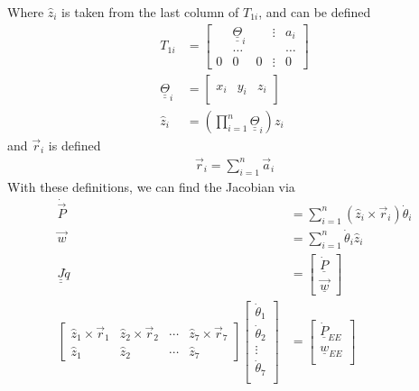 \documentclass{article}
\def\du#1{\underline{\underline{#1}}}
\begin{document}
Where $\hat{z}_i$ is taken from the last column of $T_{1i}$, and can be defined
\begin{align*}
T_{1i} &=
\left[\begin{matrix}
  & \du{\Theta}_i &   & \vdots & a_i \\
  & \hdots   &   &        & \hdots \\
0 &        0 & 0 & \vdots & 0
\end{matrix}\right] \\
\du{\Theta}_i &=
\left[\begin{matrix}
& & \\
x_i & y_i & z_i \\
& &
\end{matrix}\right] \\
\hat{z}_i &= \left( \prod_{i=1}^n \du{\Theta}_i \right) z_i
\end{align*}
and $\vec{r}_i$ is defined
\begin{align*}
\vec{r}_i = \sum_{i=1}^n \vec{a}_i
\end{align*}
With these definitions, we can find the Jacobian via
\begin{align*}
\dot{\vec{P}} &= \sum_{i=1}^{n} \left( \hat{z}_i \times \vec{r}_i \right) \dot{\theta}_i \\
\vec{w} &= \sum_{i=1}^{n} \dot{\theta}_i \hat{z}_i \\
\du{J} \dot{q} &=
\left[\begin{matrix}
\underline{\dot{P}} \\
\underline{\vec{w}}
\end{matrix}\right] \\
\left[\begin{matrix}
\hat{z}_1 \times \vec{r}_1 & \hat{z}_2 \times \vec{r}_2 & \cdots & \hat{z}_7 \times \vec{r}_7 \\
\hat{z}_1 & \hat{z}_2 & \cdots & \hat{z}_7
\end{matrix}\right]
\left[\begin{matrix}
\dot{\theta}_1 \\
\dot{\theta}_2 \\
\vdots \\
\dot{\theta}_7 \\
\end{matrix}\right]
&=
\left[\begin{matrix}
\underline{\dot{P}}_{EE} \\
\underline{w}_{EE} \\
\end{matrix}\right] \\
\end{align*}
\end{document}
